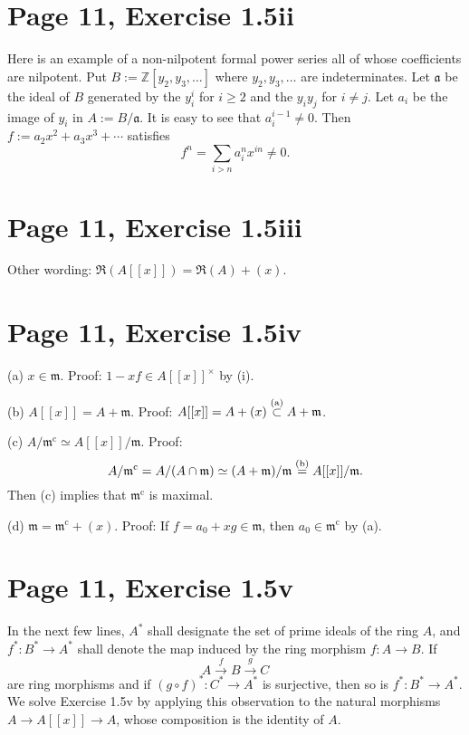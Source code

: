 \documentclass[12pt]{article}
\newcommand{\oo}{\operatorname}
\newcommand{\mf}{\mathfrak}
\newcommand{\aaa}{\mf a}
\begin{document}
\section{Page 11, Exercise 1.5ii}

Here is an example of a non-nilpotent formal power series all of whose coefficients are nilpotent. Put $B:=\mathbb Z[y_2,y_3,\dots]$ where $y_2,y_3,\dots$ are indeterminates. Let $\aaa$ be the ideal of $B$ generated by the $y_i^i$ for $i\ge2$ and the $y_iy_j$ for $i\neq j$. Let $a_i$ be the image of $y_i$ in $A:=B/\aaa$. It is easy to see that $a_i^{i-1}\neq0$. Then $f:=a_2x^2+a_3x^3+\cdots$ satisfies 
$$
f^n=\sum_{i>n}a_i^nx^{in}\neq0.
$$

\section{Page 11, Exercise 1.5iii}

Other wording: $\mf R(A[[x]])=\mf R(A)+(x)$.

\section{Page 11, Exercise 1.5iv}

(a) $x\in\mf m$. Proof: $1-xf\in A[[x]]^\times$ by (i).

(b) $A[[x]]=A+\mf m$. Proof: $A[[x]]=A+(x)\overset{(\text a)}\subset A+\mf m$.

(c) $A/\mf m^{\oo c}\simeq A[[x]]/\mf m$. Proof: 
$$
A/\mf m^{\oo c}=A/(A\cap\mf m)\simeq(A+\mf m)/\mf m\overset{(\text b)}=A[[x]]/\mf m.
$$ 
Then (c) implies that $\mf m^{\oo c}$ is maximal.

(d) $\mf m=\mf m^{\oo c}+(x)$. Proof: If $f=a_0+xg\in\mf m$, then $a_0\in\mf m^{\oo c}$ by (a).


\section{Page 11, Exercise 1.5v}

In the next few lines, $A^*$ shall designate the set of prime ideals of the ring $A$, and $f^*:B^*\to A^*$ shall denote the map induced by the ring morphism $f:A\to B$. If 
$$
A\xrightarrow fB\xrightarrow gC
$$ 
are ring morphisms and if $(g\circ f)^*:C^*\to A^*$ is surjective, then so is $f^*:B^*\to A^*$. We solve Exercise 1.5v by applying this observation to the natural morphisms $A\to A[[x]]\to A$, whose composition is the identity of $A$.
\end{document}
